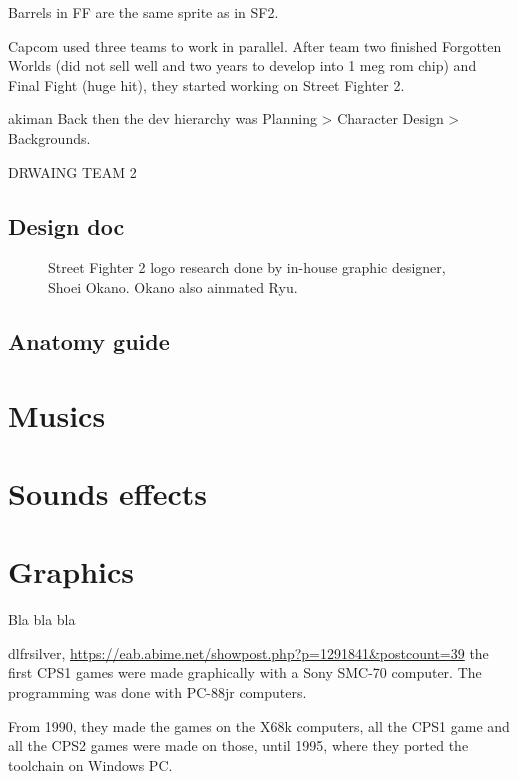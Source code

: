 Barrels in FF are the same sprite as in SF2.


Capcom used three teams to work in parallel. After team two finished Forgotten Worlds (did not sell well\cite{ar20160331} and two years to develop into 1 meg rom chip) and Final Fight (huge hit), they started working on Street Fighter 2.

\begin{q}{akiman\cite{ar20160331}}
Back then the dev hierarchy was Planning > Character Design > Backgrounds.
\end{q}

DRWAING TEAM 2



\subsection{Design doc}

\begin{figure}[H]
\caption*{Street Fighter 2 logo research done by in-house graphic designer, Shoei Okano. Okano also ainmated Ryu.}
\end{figure}











\subsection{Anatomy guide}
\section{Musics}
\section{Sounds effects}




\section{Graphics}
Bla bla bla

\begin{q}{dlfrsilver, \url{https://eab.abime.net/showpost.php?p=1291841&postcount=39}}
the first CPS1 games were made graphically with a Sony SMC-70 computer.
The programming was done with PC-88jr computers.

From 1990, they made the games on the X68k computers, all the CPS1 game and all the CPS2 games were made on those, until 1995, where they ported the toolchain on Windows PC.
\end{q}






